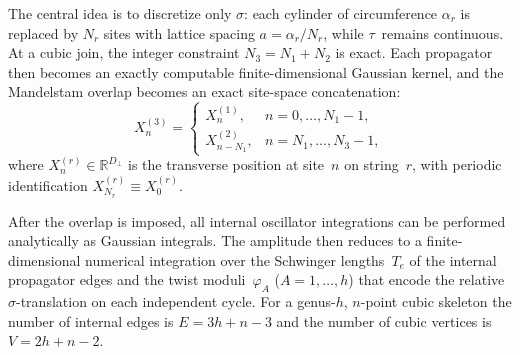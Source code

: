 \documentclass[11pt]{article}
\newcommand{\perpD}{D_\perp}
\newcommand{\RR}{\mathbb{R}}
\begin{document}
The central idea is to discretize only $\sigma$: each cylinder of circumference $\alpha_r$ is replaced by $N_r$ sites with lattice spacing $a = \alpha_r/N_r$, while $\tau$~remains continuous. At a cubic join, the integer constraint $N_3 = N_1 + N_2$ is exact. Each propagator then becomes an exactly computable finite-dimensional Gaussian kernel, and the Mandelstam overlap becomes an exact site-space concatenation:
\begin{equation}
X_n^{(3)} = \begin{cases}
X_n^{(1)}, & n = 0, \dots, N_1 - 1, \\
X_{n - N_1}^{(2)}, & n = N_1, \dots, N_3 - 1,
\end{cases}
\label{eq:overlap}
\end{equation}
where $X_n^{(r)} \in \RR^{\perpD}$ is the transverse position at site~$n$ on string~$r$, with periodic identification $X_{N_r}^{(r)} \equiv X_0^{(r)}$.

After the overlap is imposed, all internal oscillator integrations can be performed analytically as Gaussian integrals. The amplitude then reduces to a finite-dimensional numerical integration over the Schwinger lengths~$T_e$ of the internal propagator edges and the twist moduli~$\varphi_A$ ($A = 1, \dots, h$) that encode the relative $\sigma$-translation on each independent cycle. For a genus-$h$, $n$-point cubic skeleton the number of internal edges is $E = 3h + n - 3$ and the number of cubic vertices is $V = 2h + n - 2$.
\end{document}
